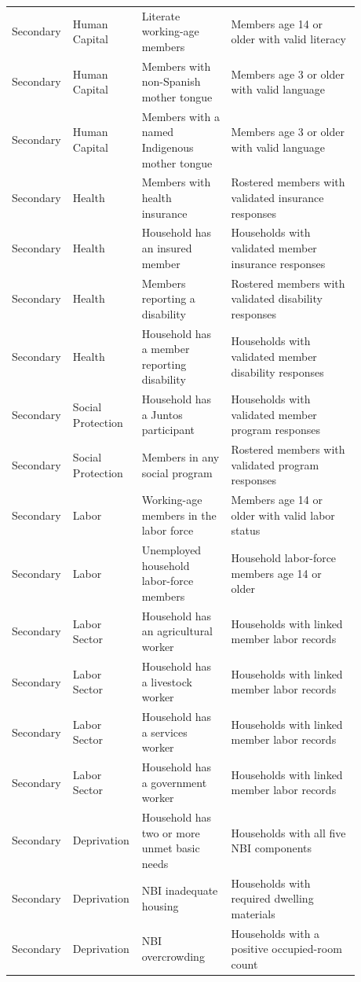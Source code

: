 \begin{longtable}{@{}>{\raggedright\arraybackslash}p{0.10\linewidth}p{0.17\linewidth}p{0.25\linewidth}p{0.36\linewidth}@{}}
Secondary & Human Capital & Literate working-age members & Members age 14 or older with valid literacy \\
Secondary & Human Capital & Members with non-Spanish mother tongue & Members age 3 or older with valid language \\
Secondary & Human Capital & Members with a named Indigenous mother tongue & Members age 3 or older with valid language \\
Secondary & Health & Members with health insurance & Rostered members with validated insurance responses \\
Secondary & Health & Household has an insured member & Households with validated member insurance responses \\
Secondary & Health & Members reporting a disability & Rostered members with validated disability responses \\
Secondary & Health & Household has a member reporting disability & Households with validated member disability responses \\
Secondary & Social Protection & Household has a Juntos participant & Households with validated member program responses \\
Secondary & Social Protection & Members in any social program & Rostered members with validated program responses \\
Secondary & Labor & Working-age members in the labor force & Members age 14 or older with valid labor status \\
Secondary & Labor & Unemployed household labor-force members & Household labor-force members age 14 or older \\
Secondary & Labor Sector & Household has an agricultural worker & Households with linked member labor records \\
Secondary & Labor Sector & Household has a livestock worker & Households with linked member labor records \\
Secondary & Labor Sector & Household has a services worker & Households with linked member labor records \\
Secondary & Labor Sector & Household has a government worker & Households with linked member labor records \\
Secondary & Deprivation & Household has two or more unmet basic needs & Households with all five NBI components \\
Secondary & Deprivation & NBI inadequate housing & Households with required dwelling materials \\
Secondary & Deprivation & NBI overcrowding & Households with a positive occupied-room count \\

\end{longtable}
